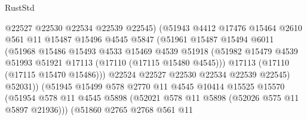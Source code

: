 \begin{lexlean}{RustStd}
\begin{coremodule}
                                @22527
                                @22530
                                @22534
                                @22539
                                @22545)
                              (@51943
                                @4412
                                @17476
                                @15464
                                @2610
                                @561
                                @11
                                @15487
                                @15496
                                @4545
                                @5847
                                (@51961
                                  @15487
                                  @15494
                                  @6011
                                  (@51968
                                    @15486
                                    @15493
                                    @4533
                                    @15469
                                    @4539
                                    @51918
                                    (@51982
                                      @15479
                                      @4539
                                      @51993
                                      @51921
                                      @17113
                                      (@17110 (@17115 @15480 @4545)))
                                    @17113
                                    (@17110 (@17115 @15470 @15486)))
                                  @22524
                                  @22527
                                  @22530
                                  @22534
                                  @22539
                                  @22545)
                                @52031))
                            (@51945
                              @15499
                              @578
                              @2770
                              @11
                              @4545
                              @10414
                              @15525
                              @15570
                              (@51954
                                @578
                                @11
                                @4545
                                @5898
                                (@52021 @578 @11 @5898 (@52026 @575 @11 @5897 @21936)))
                              (@51860
                                @2765
                                @2768
                                @561
                                @11

\end{coremodule}
\end{lexlean}
